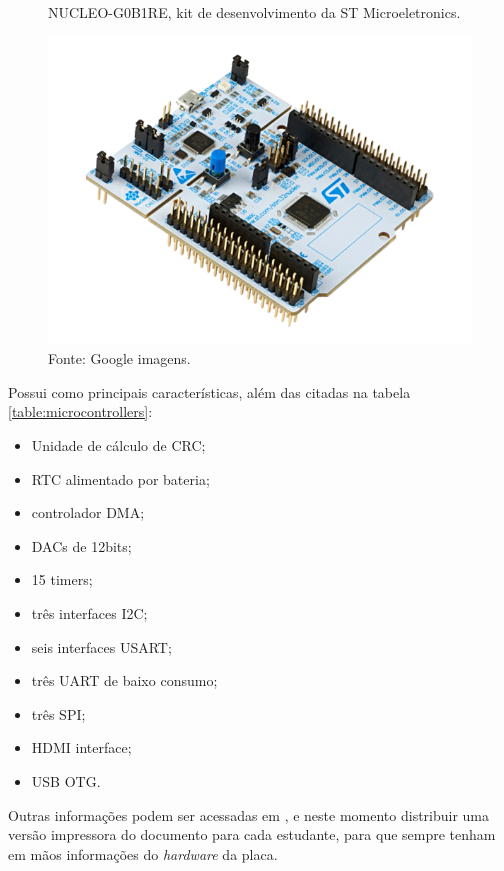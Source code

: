\documentclass[12pt,a4paper]{report}
\begin{document}
\begin{figure}[H]
    \begin{center}
    \caption{NUCLEO-G0B1RE, kit de desenvolvimento da ST Microeletronics.}		%
    \includegraphics[scale=0.6]{fig/nucleog0b1re.png}
    \caption*{Fonte: Google imagens.}
    \label{fig:nucleog0b1re}
    \end{center}
\end{figure}

Possui como principais características, além das citadas na tabela \ref{table:microcontrollers}:

\begin{itemize}
    \item Unidade de cálculo de CRC;
    \item RTC alimentado por bateria;
    \item controlador DMA;
    \item DACs de 12bits;
    \item 15 timers;
    \item três interfaces I2C;
    \item seis interfaces USART;
    \item três UART de baixo consumo;
    \item três SPI;
    \item HDMI interface;
    \item USB OTG.
\end{itemize}

Outras informações podem ser acessadas em \cite{ci:um2324}, e neste momento distribuir uma versão impressora do documento para cada estudante, para que sempre tenham em mãos informações do \textit{hardware} da placa. 
\end{document}
